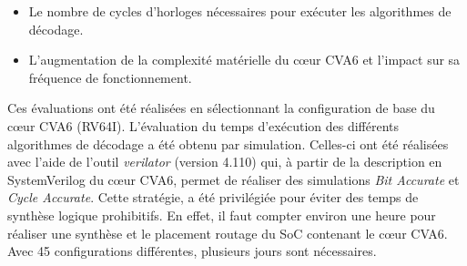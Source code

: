 \documentclass[../main.tex]{subfiles}
\begin{document}
\begin{itemize}
    \item Le nombre de cycles d'horloges nécessaires pour exécuter les algorithmes de décodage.
    \item L'augmentation de la complexité matérielle du cœur CVA6 et l'impact sur sa fréquence de fonctionnement.
\end{itemize}

Ces évaluations ont été réalisées en sélectionnant la configuration de base du cœur CVA6 (RV64I).
L'évaluation du temps d'exécution des différents algorithmes de décodage a été obtenu par simulation. 
Celles-ci ont été réalisées avec l'aide de l'outil \textit{verilator} (version 4.110) qui, à partir de la description en SystemVerilog du cœur CVA6, permet de réaliser des simulations \textit{Bit Accurate} et \textit{Cycle Accurate}.
Cette stratégie, a été privilégiée pour éviter des temps de synthèse logique prohibitifs. 
En effet, il faut compter environ une heure pour réaliser une synthèse et le placement routage du SoC contenant le cœur CVA6. Avec 45 configurations différentes, plusieurs jours sont nécessaires.
%
%
%
% 
% 
% 
\end{document}
